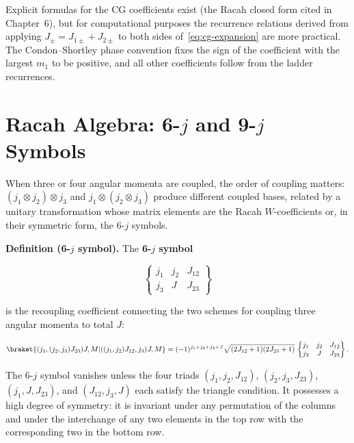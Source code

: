 Explicit formulas for the CG coefficients exist (the Racah closed form cited in Chapter~6), but for computational purposes the recurrence relations derived from applying $J_\pm = J_{1\pm} + J_{2\pm}$ to both sides of~\eqref{eq:cg-expansion} are more practical. The Condon--Shortley phase convention fixes the sign of the coefficient with the largest $m_1$ to be positive, and all other coefficients follow from the ladder recurrences.

\section{Racah Algebra: 6-$j$ and 9-$j$ Symbols}
\label{sec:appendix-racah}

When three or four angular momenta are coupled, the order of coupling matters: $(j_1 \otimes j_2) \otimes j_3$ and $j_1 \otimes (j_2 \otimes j_3)$ produce different coupled bases, related by a unitary transformation whose matrix elements are the Racah $W$-coefficients or, in their symmetric form, the 6-$j$ symbols.

\medskip\noindent\textbf{Definition (6-$j$ symbol).} The \textbf{6-$j$ symbol}
\begin{linenomath}
    \begin{equation}
        \begin{Bmatrix}
            j_1 & j_2 & J_{12} \\
            j_3 & J & J_{23}
        \end{Bmatrix}
        \label{eq:6j}
    \end{equation}
\end{linenomath}
is the recoupling coefficient connecting the two schemes for coupling three angular momenta to total $J$:
\begin{linenomath}
    \begin{equation}
        \braket{(j_1,(j_2,j_3)J_{23})J,M | ((j_1,j_2)J_{12},j_3)J,M}
        = (-1)^{j_1+j_2+j_3+J}\sqrt{(2J_{12}+1)(2J_{23}+1)}\,
        \begin{Bmatrix}
            j_1 & j_2 & J_{12} \\
            j_3 & J & J_{23}
        \end{Bmatrix}.
        \label{eq:6j-recoupling}
    \end{equation}
\end{linenomath}
The 6-$j$ symbol vanishes unless the four triads $(j_1,j_2,J_{12})$, $(j_2,j_3,J_{23})$, $(j_1,J,J_{23})$, and $(J_{12},j_3,J)$ each satisfy the triangle condition. It possesses a high degree of symmetry: it is invariant under any permutation of the columns and under the interchange of any two elements in the top row with the corresponding two in the bottom row.

